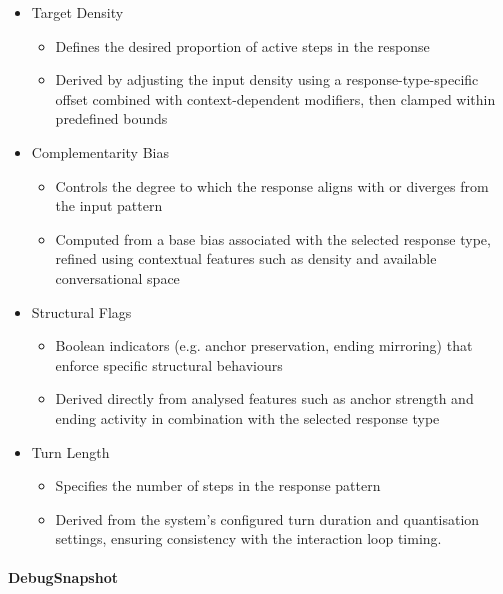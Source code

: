 \begin{itemize}
\item
  Target Density

  \begin{itemize}
  \item
    Defines the desired proportion of active steps in the response
  \item
    Derived by adjusting the input density using a
    response-type-specific offset combined with context-dependent
    modifiers, then clamped within predefined bounds
  \end{itemize}
\item
  Complementarity Bias

  \begin{itemize}
  \item
    Controls the degree to which the response aligns with or diverges
    from the input pattern
  \item
    Computed from a base bias associated with the selected response
    type, refined using contextual features such as density and
    available conversational space
  \end{itemize}
\item
  Structural Flags

  \begin{itemize}
  \item
    Boolean indicators (e.g. anchor preservation, ending mirroring) that
    enforce specific structural behaviours
  \item
    Derived directly from analysed features such as anchor strength and
    ending activity in combination with the selected response type
  \end{itemize}
\item
  Turn Length

  \begin{itemize}
  \item
    Specifies the number of steps in the response pattern
  \item
    Derived from the system's configured turn duration and quantisation
    settings, ensuring consistency with the interaction loop timing.
  \end{itemize}
\end{itemize}

\paragraph{DebugSnapshot}\label{debugsnapshot}

